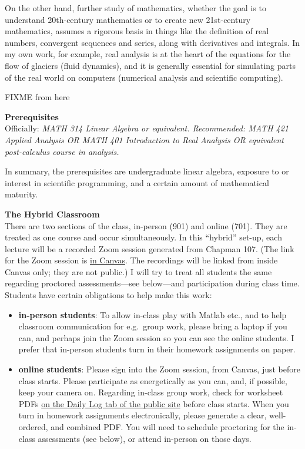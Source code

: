 \documentclass[12pt]{article}
\renewcommand{\emph}[1]{\textsf{\textbf{#1}}}
\newcommand{\localhead}[1]{\par\smallskip\textbf{#1} \smallskip\nobreak\\}%
\def\heading#1{\localhead{\large\emph{#1}}}
\begin{document}
On the other hand, further study of mathematics, whether the goal is to understand 20th-century mathematics or to create new 21st-century mathematics, assumes a rigorous basis in things like the definition of real numbers, convergent sequences and series, along with derivatives and integrals.  In my own work, for example, real analysis is at the heart of the equations for the flow of glaciers (fluid dynamics), and it is generally essential for simulating parts of the real world on computers (numerical analysis and scientific computing).

FIXME from here

\phantom{foo}
\heading{Prerequisites}
Officially: \textsl{MATH 314 Linear Algebra or equivalent.  Recommended: MATH 421 Applied Analysis OR MATH 401 Introduction to Real Analysis OR equivalent post-calculus course in analysis.}

In summary, the prerequisites are undergraduate linear algebra, exposure to or interest in scientific programming, and a certain amount of mathematical maturity.


\heading{The Hybrid Classroom}
There are two sections of the class, in-person (901) and online (701).  They are treated as one course and occur simultaneously.  In this ``hybrid'' set-up, each lecture will be a recorded Zoom session generated from Chapman 107.  (The link for the Zoom session is \href{https://canvas.alaska.edu/courses/27130}{in Canvas}.  The recordings will be linked from inside Canvas only; they are not public.)  I will try to treat all students the same regarding proctored assessments---see below---and participation during class time.  Students have certain obligations to help make this work:
\begin{itemize}
\item \textbf{in-person students}: To allow in-class play with Matlab etc., and to help classroom communication for e.g.~group work, please bring a laptop if you can, and perhaps join the Zoom session so you can see the online students.  I prefer that in-person students turn in their homework assignments on paper.
\item \textbf{online students}: Please sign into the Zoom session, from Canvas, just before class starts.  Please participate as energetically as you can, and, if possible, keep your camera on.  Regarding in-class group work, check for worksheet PDFs \href{https://bueler.github.io/nla/}{on the Daily Log tab of the public site} before class starts.  When you turn in homework assignments electronically, please generate a clear, well-ordered, and combined PDF.  You will need to schedule proctoring for the in-class assessments (see below), or attend in-person on those days.
\end{itemize}
\end{document}
